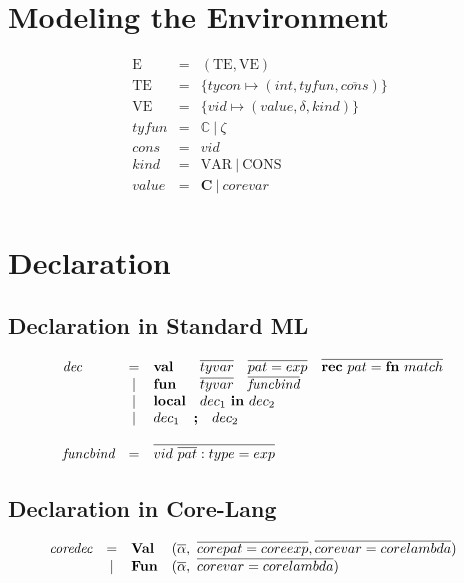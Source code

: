 \documentclass[11pt,a4paper]{article}
\newcommand{\key}[1]{\textrm{\textbf{#1}}}
\newcommand{\prodlhs}[1]{\textit{#1}}
\newcommand{\braced}[1]{\{#1\}}
\newcommand{\Env}  {\textrm{E}}
\newcommand{\VE}   {\textrm{VE}}
\newcommand{\TE}   {\textrm{TE}}
\newcommand{\VKC}  {\textrm{CONS}}
\newcommand{\VKV}  {\textrm{VAR}}
\newcommand{\tycon}{\mathbb{C}}
\newcommand{\vcon} {\mathbf{C}}
\newcommand{\vect}[1]{\overline{#1}}
\begin{document}
\section {Modeling the Environment}
\[\begin{array}{lcl}
    \Env & = & (\TE,\VE)  \\
    \TE& = & \braced{tycon \mapsto (int, tyfun, \vect{cons})} \\
    \VE& = & \braced{vid   \mapsto (value,\delta, kind)} \\
    tyfun& = & \tycon\ |\ \zeta       \\
    cons & = & vid                    \\
    kind & = & \VKV\ |\ \VKC          \\
    value& = & \vcon\ |\ corevar      \\
\end{array}\]

\section{Declaration}

\subsection{Declaration in Standard ML}
{\renewcommand{\arraystretch}{1.2}\[
\begin{array}{lclll}
\prodlhs{dec}
     & = & \key{val}  	  & \vect{tyvar} \quad \vect{pat = exp} \quad \vect{\key{rec}\ pat = \key{fn}\ match} &\\
     & | & \key{fun}      & \vect{tyvar} \quad \vect{\prodlhs{funcbind}} &\\
     & | & \key{local}    & \prodlhs{$dec_1$} \ \key{in}\ \prodlhs{$dec_2$}     &\\
     & | & \multicolumn{2}{l}{\prodlhs{$dec_1$}\quad\key{;}\quad \prodlhs{$dec_2$}} &\\
     \\
\prodlhs{funcbind}
	 & = & \multicolumn{2}{l}{\vect{vid \ \vect{pat}:type = exp}} &\\
\end{array}
\]}

\subsection{Declaration in Core-Lang}
{\renewcommand{\arraystretch}{1.2}\[
\begin{array}{lclll}
\prodlhs{coredec}
     & = & \key{Val}  	  & (\vect\alpha,\ \vect{corepat = coreexp}, \vect{corevar = corelambda}) &\\
     & | & \key{Fun}      & (\vect\alpha,\ \vect{corevar = corelambda}) &\\
\end{array}
\]}
\end{document}
